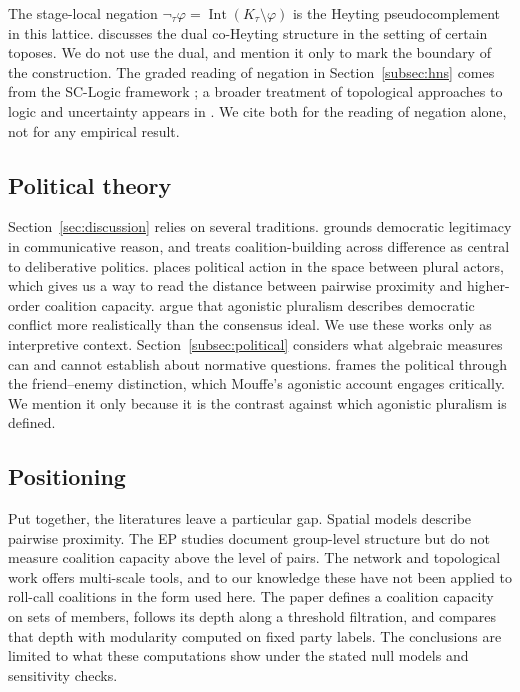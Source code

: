 \documentclass[a4paper,fleqn,oneside]{cas-sc}
\theoremstyle{definition}
\theoremstyle{plain}
\newcommand{\Int}{\operatorname{Int}}
\begin{document}
The stage-local negation $\neg_\tau\varphi=\Int(K_\tau\setminus\varphi)$ is the
Heyting pseudocomplement in this lattice. \citet{Lawvere1991} discusses the
dual co-Heyting structure in the setting of certain toposes. We do not use the
dual, and mention it only to mark the boundary of the construction. The graded reading of negation in Section~\ref{subsec:hns} comes from the SC-Logic framework \citep{Pourmoslemi2026Semantics}; a broader treatment of topological approaches to logic and uncertainty appears in \citet{Pourmoslemi2026Truth}. We cite both for the reading of negation alone, not for any empirical result.


\subsection{Political theory}

Section~\ref{sec:discussion} relies on several traditions. \citet{Habermas1996}
grounds democratic legitimacy in communicative reason, and treats
coalition-building across difference as central to deliberative politics.
\citet{Arendt1958HumanCondition} places political action in the space between
plural actors, which gives us a way to read the distance between pairwise
proximity and higher-order coalition capacity. \citet{Mouffe2000,Mouffe2013}
argue that agonistic pluralism describes democratic conflict more realistically
than the consensus ideal. We use these works only as interpretive context.
Section~\ref{subsec:political} considers what algebraic measures can and cannot
establish about normative questions. \citet{Schmitt2007} frames the political through the friend--enemy distinction, which Mouffe's agonistic account engages critically. We mention it only because it is the contrast against which agonistic pluralism is defined.

\subsection{Positioning}

Put together, the literatures leave a particular gap. Spatial models describe
pairwise proximity. The EP studies document group-level structure but do not
measure coalition capacity above the level of pairs. The network and
topological work offers multi-scale tools, and to our knowledge these have not
been applied to roll-call coalitions in the form used here. The paper defines
a coalition capacity on sets of members, follows its depth along a threshold
filtration, and compares that depth with modularity computed on fixed party
labels. The conclusions are limited to what these computations show under the
stated null models and sensitivity checks.
\end{document}
